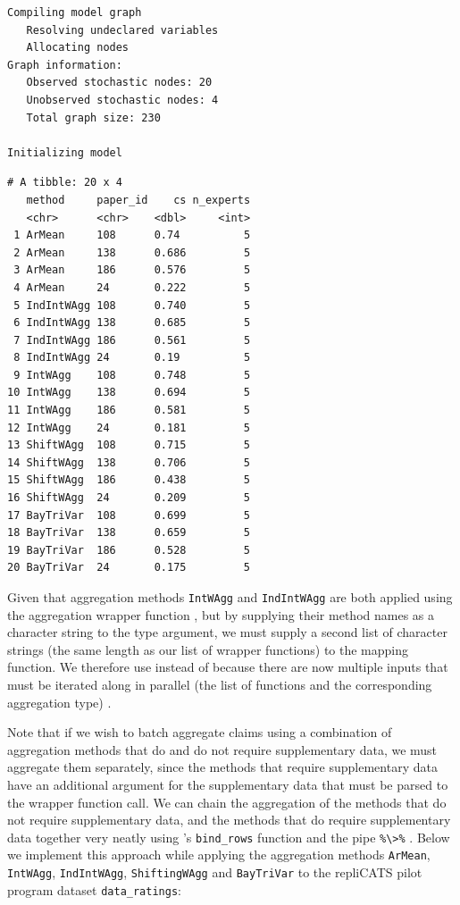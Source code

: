 \documentclass[article]{jss}
\newcommand{\fct}[1]{\code{#1()}}
\begin{document}
\begin{verbatim}
Compiling model graph
   Resolving undeclared variables
   Allocating nodes
Graph information:
   Observed stochastic nodes: 20
   Unobserved stochastic nodes: 4
   Total graph size: 230

Initializing model
\end{verbatim}

\begin{verbatim}
# A tibble: 20 x 4
   method     paper_id    cs n_experts
   <chr>      <chr>    <dbl>     <int>
 1 ArMean     108      0.74          5
 2 ArMean     138      0.686         5
 3 ArMean     186      0.576         5
 4 ArMean     24       0.222         5
 5 IndIntWAgg 108      0.740         5
 6 IndIntWAgg 138      0.685         5
 7 IndIntWAgg 186      0.561         5
 8 IndIntWAgg 24       0.19          5
 9 IntWAgg    108      0.748         5
10 IntWAgg    138      0.694         5
11 IntWAgg    186      0.581         5
12 IntWAgg    24       0.181         5
13 ShiftWAgg  108      0.715         5
14 ShiftWAgg  138      0.706         5
15 ShiftWAgg  186      0.438         5
16 ShiftWAgg  24       0.209         5
17 BayTriVar  108      0.699         5
18 BayTriVar  138      0.659         5
19 BayTriVar  186      0.528         5
20 BayTriVar  24       0.175         5
\end{verbatim}

Given that aggregation methods \texttt{IntWAgg} and \texttt{IndIntWAgg}
are both applied using the aggregation wrapper function
\fct{IntervalWAgg}, but by supplying their method names as a character
string to the {type} argument, we must supply a second list of character
strings (the same length as our list of wrapper functions) to the
mapping function. We therefore use \fct{map2\_dfr} instead of
\fct{map\_dfr} because there are now multiple inputs that must be
iterated along in parallel (the list of functions and the corresponding
aggregation {type}) \citep{wickham2017b}.

Note that if we wish to batch aggregate claims using a combination of
aggregation methods that do and do not require supplementary data, we
must aggregate them separately, since the methods that require
supplementary data have an additional argument for the supplementary
data that must be parsed to the wrapper function call. We can chain the
aggregation of the methods that do not require supplementary data, and
the methods that do require supplementary data together very neatly
using 's \texttt{bind\_rows} function \citep{dplyr2021} and
the \fct{magrittr} pipe \texttt{\%\textbackslash{}\textgreater{}\%}
\citep{magrittr2020}. Below we implement this approach while applying
the aggregation methods \texttt{ArMean}, \texttt{IntWAgg},
\texttt{IndIntWAgg}, \texttt{ShiftingWAgg} and \texttt{BayTriVar} to the
repliCATS pilot program dataset \texttt{data\_ratings}:
\end{document}

